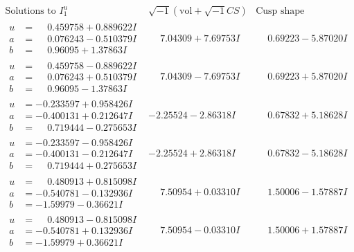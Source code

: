 \documentclass[1p]{elsarticle_modified}
\theoremstyle{definition}
\newcommand{\I}{\sqrt{-1}}
\begin{document}
$$\begin{array}{c|c|c}  
\text{Solutions to }I^u_{1}& \I (\text{vol} + \sqrt{-1}CS) & \text{Cusp shape}\\
 \hline 
\begin{aligned}
u &= \phantom{-}0.459758 + 0.889622 I \\
a &= \phantom{-}0.076243 - 0.510379 I \\
b &= \phantom{-}0.96095 + 1.37863 I\end{aligned}
 & \phantom{-}7.04309 + 7.69753 I & \phantom{-}0.69223 - 5.87020 I \\ \hline\begin{aligned}
u &= \phantom{-}0.459758 - 0.889622 I \\
a &= \phantom{-}0.076243 + 0.510379 I \\
b &= \phantom{-}0.96095 - 1.37863 I\end{aligned}
 & \phantom{-}7.04309 - 7.69753 I & \phantom{-}0.69223 + 5.87020 I \\ \hline\begin{aligned}
u &= -0.233597 + 0.958426 I \\
a &= -0.400131 + 0.212647 I \\
b &= \phantom{-}0.719444 - 0.275653 I\end{aligned}
 & -2.25524 - 2.86318 I & \phantom{-}0.67832 + 5.18628 I \\ \hline\begin{aligned}
u &= -0.233597 - 0.958426 I \\
a &= -0.400131 - 0.212647 I \\
b &= \phantom{-}0.719444 + 0.275653 I\end{aligned}
 & -2.25524 + 2.86318 I & \phantom{-}0.67832 - 5.18628 I \\ \hline\begin{aligned}
u &= \phantom{-}0.480913 + 0.815098 I \\
a &= -0.540781 - 0.132936 I \\
b &= -1.59979 - 0.36621 I\end{aligned}
 & \phantom{-}7.50954 + 0.03310 I & \phantom{-}1.50006 - 1.57887 I \\ \hline\begin{aligned}
u &= \phantom{-}0.480913 - 0.815098 I \\
a &= -0.540781 + 0.132936 I \\
b &= -1.59979 + 0.36621 I\end{aligned}
 & \phantom{-}7.50954 - 0.03310 I & \phantom{-}1.50006 + 1.57887 I \\ \hline\begin{aligned}

\end{aligned}
\end{array}$$
\end{document}

